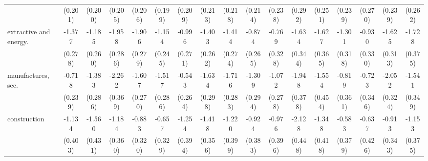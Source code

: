 {\begin{tabular}{l*{16}{c}}
                    &     (0.201)         &     (0.200)         &     (0.205)         &     (0.206)         &     (0.199)         &     (0.209)         &     (0.213)         &     (0.218)         &     (0.214)         &     (0.238)         &     (0.292)         &     (0.251)         &     (0.239)         &     (0.270)         &     (0.239)         &     (0.262)         \\
[1em]
extractive and energy.&      -1.377\sym{***}&      -1.185\sym{***}&      -1.958\sym{***}&      -1.906\sym{***}&      -1.154\sym{***}&      -0.996\sym{***}&      -1.403\sym{***}&      -1.414\sym{***}&      -0.874\sym{***}&      -0.769\sym{*}  &      -1.634\sym{***}&      -1.627\sym{***}&      -1.301\sym{***}&      -0.930\sym{**} &      -1.625\sym{***}&      -1.728\sym{***}\\
                    &     (0.278)         &     (0.260)         &     (0.286)         &     (0.279)         &     (0.245)         &     (0.271)         &     (0.262)         &     (0.274)         &     (0.265)         &     (0.328)         &     (0.344)         &     (0.365)         &     (0.318)         &     (0.330)         &     (0.313)         &     (0.375)         \\
[1em]
manufactures, sec.  &      -0.718\sym{**} &      -1.383\sym{***}&      -2.262\sym{***}&      -1.607\sym{***}&      -1.517\sym{***}&      -0.543\sym{*}  &      -1.634\sym{***}&      -1.716\sym{***}&      -1.309\sym{***}&      -1.072\sym{***}&      -1.948\sym{***}&      -1.554\sym{***}&      -0.819\sym{*}  &      -0.723\sym{*}  &      -2.052\sym{***}&      -1.541\sym{***}\\
                    &     (0.239)         &     (0.286)         &     (0.369)         &     (0.270)         &     (0.286)         &     (0.264)         &     (0.298)         &     (0.283)         &     (0.294)         &     (0.278)         &     (0.378)         &     (0.454)         &     (0.361)         &     (0.346)         &     (0.324)         &     (0.349)         \\
[1em]
construction        &      -1.134\sym{**} &      -1.560\sym{***}&      -1.184\sym{***}&      -0.883\sym{**} &      -0.657\sym{*}  &      -1.254\sym{**} &      -1.418\sym{***}&      -1.220\sym{**} &      -0.924\sym{*}  &      -0.976\sym{*}  &      -2.128\sym{***}&      -1.348\sym{**} &      -0.583         &      -0.637         &      -0.913\sym{**} &      -1.153\sym{**} \\
                    &     (0.403)         &     (0.431)         &     (0.360)         &     (0.320)         &     (0.329)         &     (0.394)         &     (0.356)         &     (0.399)         &     (0.383)         &     (0.396)         &     (0.448)         &     (0.418)         &     (0.379)         &     (0.426)         &     (0.343)         &     (0.375)         \\

\end{tabular}}
